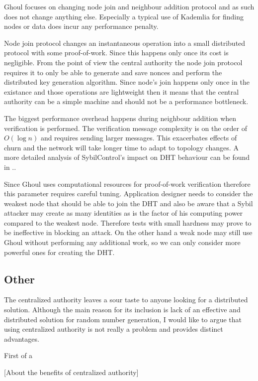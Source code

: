   Ghoul focuses on changing node join and neighbour addition protocol and as
  such does not change anything else. Especially a typical use of Kademlia for
  finding nodes or data does incur any performance penalty.

  Node join protocol changes an instantaneous operation into a small distributed
  protocol with some proof-of-work. Since this happens only once its cost is
  negligible. From the point of view the central authority the node join
  protocol requires it to only be able to generate and save nonces and perform
  the distributed key generation algorithm. Since node's join happens only once
  in the existance and those operations are lightweight then it means that the
  central authority can be a simple machine and should not be a performance
  bottleneck.

  The biggest performance overhead happens during neighbour addition when
  verification is performed. The verification message complexity is on the order
  of $O(\log n)$ and requires sending larger messages. This exacerbates effects
  of churn and the network will take longer time to adapt to topology changes.
  A more detailed analysis of SybilControl's impact on DHT behaviour can be
  found in \cite{li12}..

  Since Ghoul uses computational resources for proof-of-work verification
  therefore this parameter requires careful tuning. Application designer needs
  to consider the weakest node that should be able to join the DHT and also be
  aware that a Sybil attacker may create as many identities as is the factor
  of his computing power compared to the weakest node. Therefore tests with
  small hardness may prove to be ineffective in blocking an attack. On the other
  hand a weak node may still use Ghoul without performing any additional work,
  so we can only consider more powerful ones for creating the DHT.

  \subsection{Other}

  The centralized authority leaves a sour taste to anyone looking for a
  distributed solution. Although the main reason for its inclusion is lack of
  an effective and distributed solution for random number generation, I would
  like to argue that using centralized authority is not really a problem and
  provides distinct advantages.

  First of a


  [About the benefits of centralized authority]
